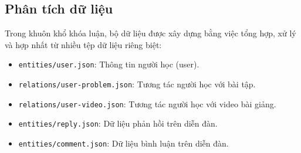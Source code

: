 \subsection{Phân tích dữ liệu}
Trong khuôn khổ khóa luận, bộ dữ liệu được xây dựng bằng việc tổng hợp, xử lý và hợp nhất từ nhiều tệp dữ liệu riêng biệt:
\begin{itemize}
    \item \texttt{entities/user.json}: Thông tin người học (user).
    \item \texttt{relations/user-problem.json}: Tương tác người học với bài tập.
    \item \texttt{relations/user-video.json}: Tương tác người học với video bài giảng.
    \item \texttt{entities/reply.json}: Dữ liệu phản hồi trên diễn đàn.
    \item \texttt{entities/comment.json}: Dữ liệu bình luận trên diễn đàn.
\end{itemize}

